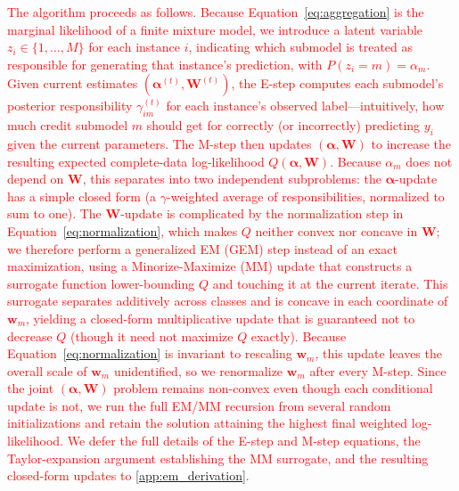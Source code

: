 \documentclass[11pt]{elsarticle}
\newcommand{\revadd}[1]{\textcolor{red}{#1}}
\begin{document}
\revadd{The algorithm proceeds as follows. Because Equation~\ref{eq:aggregation} is the marginal likelihood of a finite mixture model, we introduce a latent variable $z_i \in \{1, \ldots, M\}$ for each instance $i$, indicating which submodel is treated as responsible for generating that instance's prediction, with $P(z_i = m) = \alpha_m$. Given current estimates $(\bm{\alpha}^{(t)}, \bm{W}^{(t)})$, the E-step computes each submodel's posterior responsibility $\gamma_{im}^{(t)}$ for each instance's observed label---intuitively, how much credit submodel $m$ should get for correctly (or incorrectly) predicting $y_i$ given the current parameters. The M-step then updates $(\bm{\alpha}, \bm{W})$ to increase the resulting expected complete-data log-likelihood $Q(\bm{\alpha}, \bm{W})$. Because $\alpha_m$ does not depend on $\bm{W}$, this separates into two independent subproblems: the $\bm{\alpha}$-update has a simple closed form (a $\gamma$-weighted average of responsibilities, normalized to sum to one). The $\bm{W}$-update is complicated by the normalization step in Equation~\ref{eq:normalization}, which makes $Q$ neither convex nor concave in $\bm{W}$; we therefore perform a generalized EM (GEM) step instead of an exact maximization, using a Minorize-Maximize (MM) update \citep{hunterlange2004mm} that constructs a surrogate function lower-bounding $Q$ and touching it at the current iterate. This surrogate separates additively across classes and is concave in each coordinate of $\bm{w}_m$, yielding a closed-form multiplicative update that is guaranteed not to decrease $Q$ (though it need not maximize $Q$ exactly). Because Equation~\ref{eq:normalization} is invariant to rescaling $\bm{w}_m$, this update leaves the overall scale of $\bm{w}_m$ unidentified, so we renormalize $\bm{w}_m$ after every M-step. Since the joint $(\bm{\alpha}, \bm{W})$ problem remains non-convex even though each conditional update is not, we run the full EM/MM recursion from several random initializations and retain the solution attaining the highest final weighted log-likelihood. We defer the full details of the E-step and M-step equations, the Taylor-expansion argument establishing the MM surrogate, and the resulting closed-form updates to \ref{app:em_derivation}.}
\end{document}
